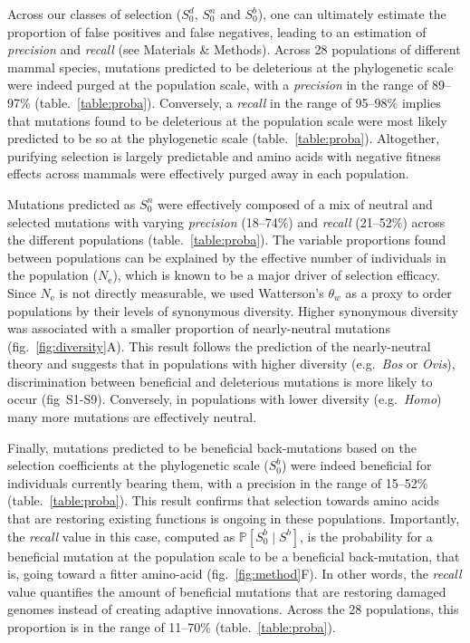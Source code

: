 \documentclass{article}
\newcommand{\Ne}{N_{\text{e}}}
\newcommand{\proba}{\mathbb{P}}
\newcommand{\Sphy}{S_{0}}
\newcommand{\SphyDel}{\Sphy^{d}}
\newcommand{\SphyNeu}{\Sphy^{n}}
\newcommand{\SphyBen}{\Sphy^{b}}
\newcommand{\given}{\mid}
\newcommand{\Spop}{S}
\newcommand{\SpopBen}{\Spop^{b}}
\begin{document}
    Across our classes of selection ($\SphyDel$, $\SphyNeu$ and $\SphyBen$), one can ultimately estimate the proportion of false positives and false negatives, leading to an estimation of \textit{precision} and \textit{recall} (see Materials \& Methods).
    Across 28 populations of different mammal species, mutations predicted to be deleterious at the phylogenetic scale were indeed purged at the population scale, with a \textit{precision} in the range of 89--97\% (table.~\ref{table:proba}).
    Conversely, a \textit{recall} in the range of 95--98\% implies that mutations found to be deleterious at the population scale were most likely predicted to be so at the phylogenetic scale (table.~\ref{table:proba}).
    Altogether, purifying selection is largely predictable and amino acids with negative fitness effects across mammals were effectively purged away in each population.

    Mutations predicted as $\SphyNeu$ were effectively composed of a mix of neutral and selected mutations with varying \textit{precision} (18--74\%) and \textit{recall} (21--52\%) across the different populations (table.~\ref{table:proba}).
    The variable proportions found between populations can be explained by the effective number of individuals in the population ($\Ne$), which is known to be a major driver of selection efficacy.
    Since $\Ne$ is not directly measurable, we used Watterson's $\theta_w$ as a proxy to order populations by their levels of synonymous diversity.
    Higher synonymous diversity was associated with a smaller proportion of nearly-neutral mutations (fig.~\ref{fig:diversity}A).
    This result follows the prediction of the nearly-neutral theory and suggests that in populations with higher diversity (e.g.~\textit{Bos} or \textit{Ovis}), discrimination between beneficial and deleterious mutations is more likely to occur (fig~S1-S9).
    Conversely, in populations with lower diversity (e.g.~\textit{Homo}) many more mutations are effectively neutral.

    Finally, mutations predicted to be beneficial back-mutations based on the selection coefficients at the phylogenetic scale ($\SphyBen$) were indeed beneficial for individuals currently bearing them, with a precision in the range of 15--52\% (table.~\ref{table:proba}).
    This result confirms that selection towards amino acids that are restoring existing functions is ongoing in these populations.
    Importantly, the \textit{recall} value in this case, computed as $\proba [ \SphyBen  \given  \SpopBen]$, is the probability for a beneficial mutation at the population scale to be a beneficial back-mutation, that is, going toward a fitter amino-acid (fig.~\ref{fig:method}F).
    In other words, the \textit{recall} value quantifies the amount of beneficial mutations that are restoring damaged genomes instead of creating adaptive innovations.
    Across the 28 populations, this proportion is in the range of 11--70\% (table.~\ref{table:proba}).
\end{document}
